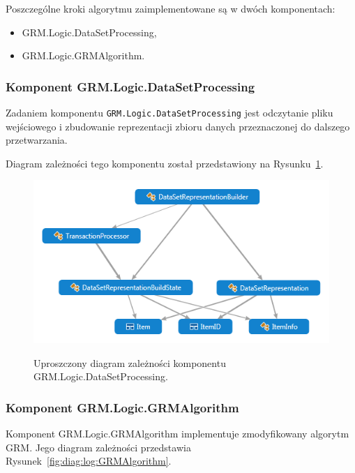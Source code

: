 \documentclass[a4paper,10pt]{article}
\begin{document}
 Poszczególne kroki algorytmu zaimplementowane są w dwóch komponentach:
 
 \begin{itemize}
  \item GRM.Logic.DataSetProcessing,
  \item GRM.Logic.GRMAlgorithm.
 \end{itemize}

 
  \subsubsection{Komponent GRM.Logic.DataSetProcessing}
  Zadaniem komponentu \verb+GRM.Logic.DataSetProcessing+ jest odczytanie pliku wejściowego i zbudowanie reprezentacji zbioru danych przeznaczonej do dalszego przetwarzania.
  
  Diagram zależności tego komponentu został przedstawiony na Rysunku~\ref{fig:diag:log:DataSetProcessing}.
  
  \begin{figure}[!ht]
   \begin{center}
    \scalebox{0.7}
    {
     \includegraphics{../diagrams/DataSetProcessing_dependency_diagram.png}
    }
   \end{center}
   \caption{
    Uproszczony diagram zależności komponentu GRM.Logic.DataSetProcessing.
   }
   \label{fig:diag:log:DataSetProcessing}
  \end{figure}
 
  \subsubsection{Komponent GRM.Logic.GRMAlgorithm}
  Komponent GRM.Logic.GRMAlgorithm implementuje zmodyfikowany algorytm GRM.
  Jego diagram zależności przedstawia Rysunek~\ref{fig:diag:log:GRMAlgorithm}.
  
\end{document}
